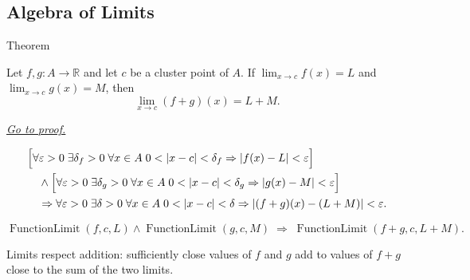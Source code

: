 
\subsection*{Algebra of Limits}
\label{sec:algebra-of-limits-functions}

\begin{theorembox}{Theorem}
\begin{theorem}
\label{thm:limit-sum}
Let $f,g:A\to\mathbb{R}$ and let $c$ be a cluster point of $A$. If
$\lim_{x\to c}f(x)=L$ and $\lim_{x\to c}g(x)=M$, then
\[
  \lim_{x\to c}(f+g)(x)=L+M.
\]

\smallskip\noindent
\hyperref[prf:limit-sum]{\textit{Go to proof.}}
\end{theorem}
\end{theorembox}

\begin{remark*}
\[
\begin{aligned}
&\Bigl[\forall\varepsilon>0\;\exists\delta_f>0\;\forall x\in A\;
  0<|x-c|<\delta_f\Rightarrow |f(x)-L|<\varepsilon\Bigr] \\
&\quad\wedge
\Bigl[\forall\varepsilon>0\;\exists\delta_g>0\;\forall x\in A\;
  0<|x-c|<\delta_g\Rightarrow |g(x)-M|<\varepsilon\Bigr] \\
&\quad\Rightarrow
\forall\varepsilon>0\;\exists\delta>0\;\forall x\in A\;
0<|x-c|<\delta\Rightarrow |(f+g)(x)-(L+M)|<\varepsilon.
\end{aligned}
\]
\end{remark*}

\begin{remark*}
\[
  \operatorname{FunctionLimit}(f,c,L)\wedge\operatorname{FunctionLimit}(g,c,M)
  \;\Longrightarrow\;
  \operatorname{FunctionLimit}(f+g,c,L+M).
\]
\end{remark*}

\begin{remark*}[Interpretation]
Limits respect addition: sufficiently close values of $f$ and $g$ add to
values of $f+g$ close to the sum of the two limits.
\end{remark*}

